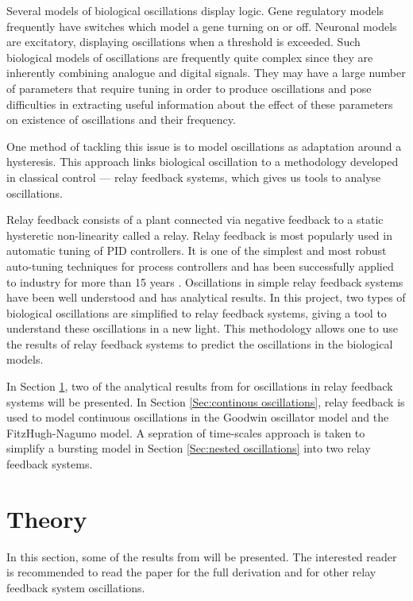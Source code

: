 \documentclass[a4paper, 12pt]{article}
\begin{document}
Several models of biological oscillations display logic. Gene regulatory models frequently have switches which model a gene turning on or off. Neuronal models are excitatory, displaying oscillations when a threshold is exceeded. Such biological models of oscillations are frequently quite complex since they are inherently combining analogue and digital signals. They may have a large number of parameters that require tuning in order to produce oscillations and pose difficulties in extracting useful information about the effect of these parameters on existence of oscillations and their frequency.

One method of tackling this issue is to model oscillations as adaptation around a hysteresis. This approach links biological oscillation to a methodology developed in classical control --- relay feedback systems, which gives us tools to analyse oscillations.

Relay feedback consists of a plant connected via negative feedback to a static hysteretic non-linearity called a relay. Relay feedback is most popularly used in automatic tuning of PID controllers. It is one of the simplest and most robust auto-tuning techniques for process controllers and has been successfully applied to industry for more than 15 years \cite{hang}. Oscillations in simple relay feedback systems have been well understood and has analytical results. In this project, two types of biological oscillations are simplified to relay feedback systems, giving a tool to understand these oscillations in a new light. This methodology allows one to use the results of relay feedback systems to predict the oscillations in the biological models. 

In Section \ref{Sec:theory}, two of the analytical results from \cite{astrom1995} for oscillations in relay feedback systems will be presented. In Section \ref{Sec:continous oscillations}, relay feedback is used to model continuous oscillations in the Goodwin oscillator model and the FitzHugh-Nagumo model. A sepration of time-scales approach is taken to simplify a bursting model in Section \ref{Sec:nested oscillations} into two relay feedback systems. 

\section{Theory}\label{Sec:theory}
In this section, some of the results from \cite{astrom1995} will be presented. The interested reader is recommended to read the paper for the full derivation and for other relay feedback system oscillations.
\end{document}
